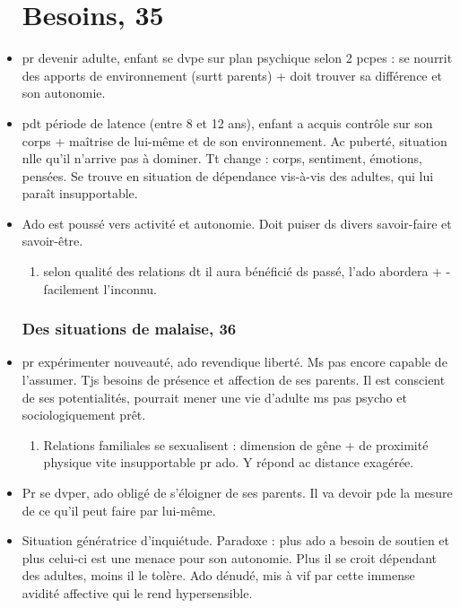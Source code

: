 \documentclass[12pt]{report}
\begin{document}
\begin{itemize}
\chapter{Besoins, 35}

\item pr devenir adulte, enfant se dvpe sur plan psychique selon 2 pcpes : se nourrit des apports de environnement (surtt parents) + doit trouver sa différence et son autonomie. \\

\item  pdt période de latence (entre 8 et 12 ans), enfant a acquis contrôle sur son corps + maîtrise de lui-même et de son environnement. Ac puberté, situation nlle qu'il n'arrive pas à dominer. Tt change : corps, sentiment, émotions, pensées. Se trouve en situation de dépendance vis-à-vis des adultes, qui lui paraît insupportable. \\

\item Ado est poussé vers activité et autonomie.  Doit puiser ds divers savoir-faire et savoir-être.
\begin{enumerate}
\item selon qualité des relations dt il aura bénéficié ds passé, l'ado abordera + - facilement l'inconnu. 
\end{enumerate}

\subsection{Des situations de malaise, 36}

\item pr expérimenter nouveauté, ado revendique liberté. Ms pas encore capable de l'assumer. Tjs besoins de présence et affection de ses parents. Il est conscient de ses potentialités, pourrait mener une vie d'adulte ms pas psycho et sociologiquement prêt.
\begin{enumerate}
\item Relations familiales se sexualisent : dimension de gêne +  de proximité physique vite insupportable pr ado. Y répond ac distance exagérée.\\
\end{enumerate}

\item Pr se dvper, ado obligé de s'éloigner de ses parents. Il va devoir pde la mesure de ce qu'il peut faire par lui-même.\\
\item Situation génératrice d'inquiétude. Paradoxe : plus ado a besoin de soutien et plus celui-ci est une menace pour son autonomie. Plus il se croit dépendant des adultes, moins il le tolère. Ado dénudé, mis à vif par cette immense avidité affective qui le rend hypersensible. \\


\end{itemize}
\end{document}
